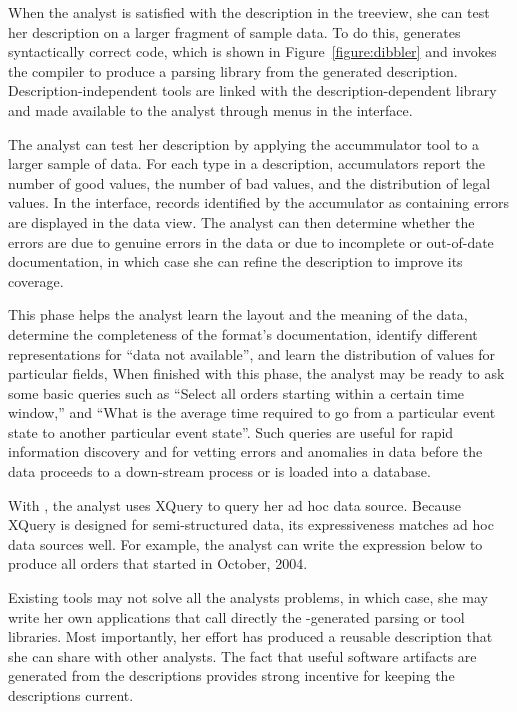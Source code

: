 When the analyst is satisfied with the description in the treeview,
she can test her description on a larger fragment of sample data.  To
do this, \launchpads{} generates syntactically correct \pads{} code,
which is shown in Figure~\ref{figure:dibbler}
and invokes the \pads{} compiler to produce a parsing library from the
generated description.  Description-independent tools are linked with
the description-dependent library and made available to the analyst
through menus in the \launchpads{} interface.  

The analyst can test her description by applying the accummulator tool
to a larger sample of data.  For each type in a \pads{} description,
accumulators report the number of good values, the number of bad
values, and the distribution of legal values.  In the \launchpads{}
interface, records identified by the accumulator as containing errors
are displayed in the data view.  The analyst can then determine
whether the errors are due to genuine errors in the data or due to
incomplete or out-of-date documentation, in which case she can refine
the description to improve its coverage.

This phase helps the analyst learn the layout and the meaning of the
data, determine the completeness of the format's documentation,
identify different representations for ``data not available'', and
learn the distribution of values for particular fields, \etc{}  When
finished with this phase, the analyst may be ready to ask some basic
queries such as ``Select all orders starting within a certain time
window,'' and ``What is the average time required to go from a
particular event state to another particular event state''.  Such
queries are useful for rapid information discovery and for vetting
errors and anomalies in data before the data proceeds to a
down-stream process or is loaded into a database.

With \pads{}, the analyst uses XQuery to query her ad hoc data source.
Because XQuery is designed for semi-structured data, its
expressiveness matches ad hoc data sources well.  For example, the
analyst can write the expression below to produce all orders
that started in October, 2004.

Existing \pads{} tools may not solve all the analysts problems,
in which case, she may write her own \pads{} applications that call  directly
the \pads{}-generated parsing or tool libraries.  Most
importantly, her effort has produced a reusable description that she
can share with other analysts.  The fact that useful software
artifacts are generated from the descriptions provides strong
incentive for keeping the descriptions current.



